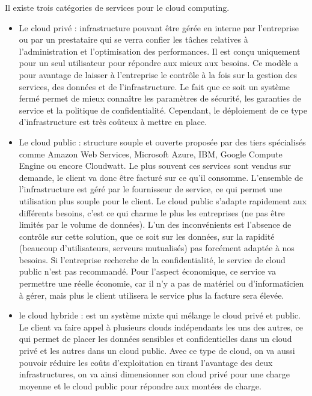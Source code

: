 \documentclass[]{article}
\begin{document}
Il existe trois catégories de services pour le cloud computing.

\begin{itemize}
\item
  Le cloud privé : infrastructure pouvant être gérée en interne par
  l'entreprise ou par un prestataire qui se verra confier les tâches
  relatives à l'administration et l'optimisation des performances. Il
  est conçu uniquement pour un seul utilisateur pour répondre aux mieux
  aux besoins. Ce modèle a pour avantage de laisser à l'entreprise le
  contrôle à la fois sur la gestion des services, des données et de
  l'infrastructure. Le fait que ce soit un système fermé permet de mieux
  connaître les paramètres de sécurité, les garanties de service et la
  politique de confidentialité. Cependant, le déploiement de ce type
  d'infrastructure est très coûteux à mettre en place.
\item
  Le cloud public : structure souple et ouverte proposée par des tiers
  spécialisés comme Amazon Web Services, Microsoft Azure, IBM, Google
  Compute Engine ou encore Cloudwatt. Le plus souvent ces services sont
  vendus sur demande, le client va donc être facturé sur ce qu'il
  consomme. L'ensemble de l'infrastructure est géré par le fournisseur
  de service, ce qui permet une utilisation plus souple pour le client.
  Le cloud public s'adapte rapidement aux différents besoins, c'est ce
  qui charme le plus les entreprises (ne pas être limités par le volume
  de données). L'un des inconvénients est l'absence de contrôle sur
  cette solution, que ce soit sur les données, sur la rapidité (beaucoup
  d'utilisateurs, serveurs mutualisés) pas forcément adaptée à nos
  besoins. Si l'entreprise recherche de la confidentialité, le service
  de cloud public n'est pas recommandé. Pour l'aspect économique, ce
  service va permettre une réelle économie, car il n'y a pas de matériel
  ou d'informaticien à gérer, mais plus le client utilisera le service
  plus la facture sera élevée.
\item
  le cloud hybride : est un système mixte qui mélange le cloud privé et
  public. Le client va faire appel à plusieurs clouds indépendants les
  uns des autres, ce qui permet de placer les données sensibles et
  confidentielles dans un cloud privé et les autres dans un cloud
  public. Avec ce type de cloud, on va aussi pouvoir réduire les coûts
  d'exploitation en tirant l'avantage des deux infrastructures, on va
  ainsi dimensionner son cloud privé pour une charge moyenne et le cloud
  public pour répondre aux montées de charge.
\end{itemize}
\end{document}
